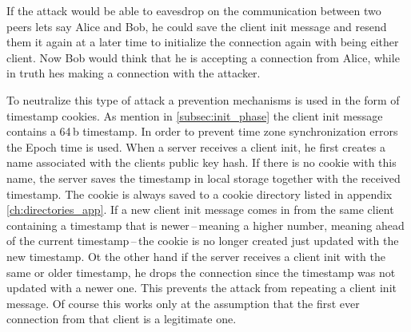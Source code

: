 If the attack would be able to eavesdrop on the communication between two peers lets say Alice and Bob, he could save the client init message and resend them it again at a later time to initialize the connection again with being either client. Now Bob would think that he is accepting a connection from Alice, while in truth hes making a connection with the attacker.

To neutralize this type of attack a prevention mechanisms is used in the form of timestamp cookies. As mention in \ref{subsec:init_phase} the client init message contains a 64\,b timestamp. In order to prevent time zone synchronization errors the Epoch time is used. When a server receives a client init, he first creates a name associated with the clients public key hash. If there is no cookie with this name, the server saves the timestamp in local storage together with the received timestamp. The cookie is always saved to a cookie directory listed in appendix \ref{ch:directories_app}. If a new client init message comes in from the same client containing a timestamp that is newer\,--\,meaning a higher number, meaning ahead of the current timestamp\,--\,the cookie is no longer created just updated with the new timestamp. Ot the other hand if the server receives a client init with the same or older timestamp, he drops the connection since the timestamp was not updated with a newer one. This prevents the attack from repeating a client init message. Of course this works only at the assumption that the first ever connection from that client is a legitimate one.

